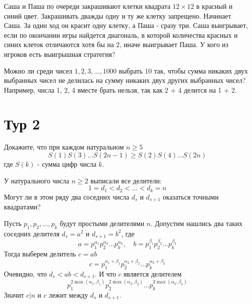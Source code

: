 \documentclass[11pt, a4paper]{common/document_template}
\begin{document}
\begin{exercise}
Саша и Паша по очереди закрашивают клетки квадрата $12 \times 12$ в красный и синий цвет. Закрашивать дважды одну и ту же клетку запрещено. Начинает Саша. За один ход он красит одну клетку, а Паша - сразу три. Саша выигрывает, если по окончании игры найдется диагональ, в которой количества красных и синих клеток отличаются
хотя бы на 2, иначе выигрывает Паша. У кого из игроков есть выигрышная стратегия?
\end{exercise}

\begin{exercise}
Можно ли среди чисел $1, 2, 3, \dots, 1000$ выбрать 10 так, чтобы сумма никаких двух выбранных чисел не делилась на сумму никаких двух других выбранных чисел? Например, числа 1, 2, 4 вместе брать нельзя, так как 2 + 4 делится на 1 + 2.
\end{exercise}

\section{Тур 2}

\begin{exercise}
Докажите, что при каждом натуральном $n \geqslant 5$
$$
S(1)S(3)\dots S(2n-1) \geqslant S(2)S(4)\dots S(2n)
$$
где $S(k)$ - сумма цифр числа $k$.
\end{exercise}

\begin{exercise}
У натурального числа $n \geqslant 2$ выписали все делители:
$$
1 = d_{1} < d_{2} < \dots < d_{k} = n
$$
Могут ли в этом ряду два соседних числа $d_{s}$ и $d_{s+1}$ оказаться точными квадратами?
\end{exercise}

\begin{Solution}
Пусть $p_{1}, p_{2}, \dots, p_{k}$ будут простыми делителями $n$. Допустим нашлись два таких соседних делителя $d_{s} = a^{2}$ и $d_{s+1} = b^{2}$, где
$$
a = p_{1}^{\alpha_{1}} p_{2}^{\alpha_{2}} \dots p_{k}^{\alpha_{k}}, \quad b = p_{1}^{\beta_{1}} p_{2}^{\beta_{2}} \dots p_{k}^{\beta_{k}}
$$
Тогда выберем делитель $c = ab$
$$
c = p_{1}^{\alpha_{1} + \beta_{1}} p_{2}^{\alpha_{2} + \beta_{2}} \dots p_{k}^{\alpha_{k} + \beta_{k}}  
$$
Очевидно, что $d_{s} < ab < d_{s+1}$. И что $c$ является делителем
$$
p_{1}^{2 \max(\alpha_{1}, \beta_{1})} p_{2}^{2 \max(\alpha_{2}, \beta_{2})} \dots p_{k}^{2 \max(\alpha_{k}, \beta_{k})}
$$
Значит $c | n$ и $c$ лежит между $d_{s}$ и $d_{s+1}$.
\end{Solution}
\end{document}
